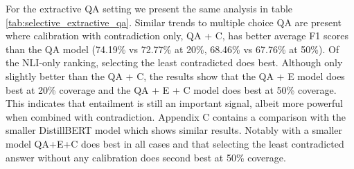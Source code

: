 \documentclass[11pt]{article}
\begin{document}
For the extractive QA setting we present the same analysis in table \ref{tab:selective_extractive_qa}. Similar trends to multiple choice QA are present where calibration with contradiction only, QA + C, has better average F1 scores than the QA model (74.19\% vs 72.77\% at 20\%, 68.46\% vs 67.76\% at 50\%). Of the NLI-only ranking, selecting the least contradicted does best. Although only slightly better than the QA + C, the results show that the QA + E model does best at 20\% coverage and the QA + E + C model does best at 50\% coverage. This indicates that entailment is still an important signal, albeit more powerful when combined with contradiction. Appendix C contains a comparison with the smaller DistillBERT model which shows similar results. Notably with a smaller model QA+E+C does best in all cases and that selecting the least contradicted answer without any calibration does second best at 50\% coverage.
\end{document}
